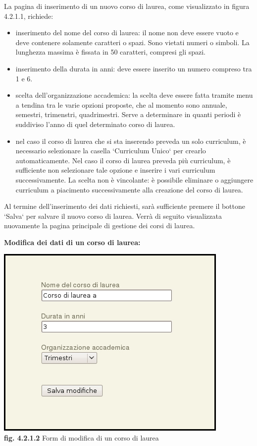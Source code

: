 \documentclass[11pt,a4paper]{article}
\begin{document}
La pagina di inserimento di un nuovo corso di laurea, come visualizzato in figura 4.2.1.1, richiede:
\begin{itemize}
 \item inserimento del nome del corso di laurea: il nome non deve essere vuoto e deve contenere solamente caratteri o spazi. Sono vietati numeri o simboli. La lunghezza massima è fissata in 50 caratteri, compresi gli spazi.
 \item inserimento della durata in anni: deve essere inserito un numero compreso tra 1 e 6.
 \item scelta dell'organizzazione accademica: la scelta deve essere fatta tramite menu a tendina tra le varie opzioni proposte, che al momento sono annuale, semestri, trimenstri, quadrimestri. Serve a determinare in quanti periodi è suddiviso l'anno di quel determinato corso di laurea.
 \item nel caso il corso di laurea che si sta inserendo preveda un solo curriculum, è necessario selezionare la casella `Curriculum Unico` per crearlo automaticamente. Nel caso il corso di laurea preveda più curriculum, è sufficiente non selezionare tale opzione e inserire i vari curriculum successivamente. La scelta non è vincolante: è possibile eliminare o aggiungere curriculum a piacimento successivamente alla creazione del corso di laurea.
\end{itemize}
Al termine dell'inserimento dei dati richiesti, sarà sufficiente premere il bottone `Salva` per salvare il nuovo corso di laurea. Verrà di seguito visualizzata nuovamente la pagina principale di gestione dei corsi di laurea. 
\newline \newline
\begin{large}\textbf{Modifica dei dati di un corso di laurea:}\end{large}

\begin{center}
	\includegraphics[scale=0.5]{images/modifica_corso.jpg}\\
	\textbf{fig. 4.2.1.2} Form di modifica di un corso di laurea\\
\end{center}
\end{document}
